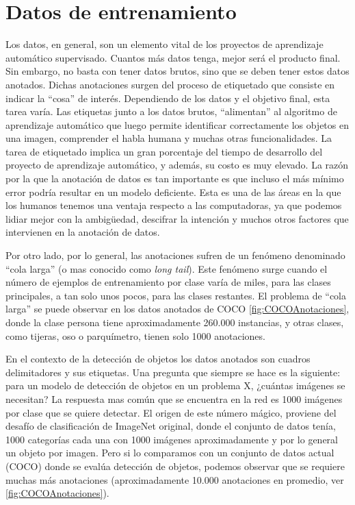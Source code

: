 \section{Datos de entrenamiento} \label{sec:datosdeentrenamiento}
Los datos, en general, son un elemento vital de los proyectos de aprendizaje automático supervisado. Cuantos más datos tenga, mejor será el producto final. Sin embargo, no basta con tener datos brutos, sino que se deben tener estos datos anotados. Dichas anotaciones surgen del proceso de etiquetado que consiste en indicar la ``cosa'' de interés. Dependiendo de los datos y el objetivo final, esta tarea varía. Las etiquetas junto a los datos brutos, ``alimentan'' al algoritmo de aprendizaje automático que luego permite identificar correctamente los objetos en una imagen, comprender el habla humana y muchas otras funcionalidades. La tarea de etiquetado implica un gran porcentaje del tiempo de desarrollo del proyecto de aprendizaje automático, y además, su costo es muy elevado. La razón por la que la anotación de datos es tan importante es que incluso el más mínimo error podría resultar en un modelo deficiente. Esta es una de las áreas en la que los humanos tenemos una ventaja respecto a las computadoras, ya que podemos lidiar mejor con la ambigüedad, descifrar la intención y muchos otros factores que intervienen en la anotación de datos.

Por otro lado, por lo general, las anotaciones sufren de un fenómeno denominado ``cola larga'' (o mas conocido como \textit{long tail}). Este fenómeno surge cuando  el número de ejemplos de entrenamiento por clase varía de miles, para las clases principales, a tan solo unos pocos, para las clases restantes. El problema de ``cola larga'' se puede observar en los datos anotados de COCO  \autoref{fig:COCOAnotaciones}, donde la clase persona tiene aproximadamente 260.000 instancias, y otras clases, como tijeras, oso o parquímetro, tienen solo 1000 anotaciones.

En el contexto de la detección de objetos los datos anotados son cuadros delimitadores y sus etiquetas. Una pregunta que siempre se hace es la siguiente: para un modelo de detección de objetos en un problema X, ¿cuántas imágenes se necesitan? La respuesta mas común que se encuentra en la red es 1000 imágenes por clase que se quiere detectar. El origen de este número mágico, proviene del desafío de clasificación de ImageNet original, donde el conjunto de datos tenía, 1000 categorías cada una con 1000 imágenes aproximadamente y por lo general un objeto por imagen. Pero si lo comparamos con un conjunto de datos actual (COCO) donde se evalúa detección de objetos, podemos observar que se requiere muchas más anotaciones (aproximadamente 10.000 anotaciones en promedio, ver \autoref{fig:COCOAnotaciones}).

